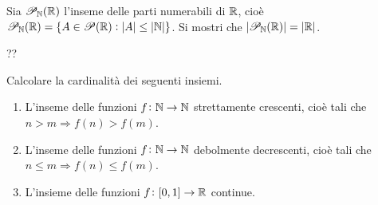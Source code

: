 \begin{es}
  Sia $ \mathscr{P}_{\mathbb{N}}(\mathbb{R}) $ l'inseme delle parti numerabili di $ \mathbb{R} $, cioè $ \mathscr{P}_{\mathbb{N}}(\mathbb{R}) = \{A \in \mathscr{P}(\mathbb{R}) : |A| \leq |\mathbb{N}|\} $. Si mostri che $ |\mathscr{P}_{\mathbb{N}}(\mathbb{R})| = |\mathbb{R}| $.
\end{es}
??

\begin{es}
  Calcolare la cardinalità dei seguenti insiemi.
  \begin{enumerate}
  \item L'inseme delle funzioni $ f \colon \mathbb{N} \to \mathbb{N} $ strettamente crescenti, cioè tali che $ n > m \Rightarrow f(n) > f(m) $.
  \item L'inseme delle funzioni $ f \colon \mathbb{N} \to \mathbb{N} $ debolmente decrescenti, cioè tali che $ n \leq m \Rightarrow f(n) \leq f(m) $.
  \item L'insieme delle funzioni $ f \colon [0, 1] \to \mathbb{R} $ continue.
  \end{enumerate}
\end{es}
